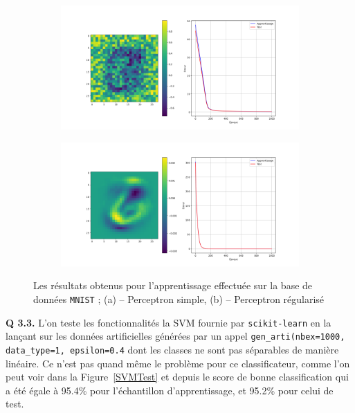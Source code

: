 \documentclass[a4paper,11pt]{article}
\theoremstyle{plain}
\theoremstyle{definition}
\begin{document}
\begin{figure}
    \centering
    \begin{subfigure}{1.0\textwidth}
    	\centering
    	\includegraphics{Figures/Figure_11.png}
    	\caption{}
    	\label{PercNotRegRes}
    \end{subfigure}

    \begin{subfigure}{1.0\textwidth}
    	\centering
    	\includegraphics{Figures/Figure_12.png}
    	\caption{}
    	\label{PercIsRegRes}
    \end{subfigure}
    \caption{Les résultats obtenus pour l'apprentissage effectuée sur la base de données \texttt{MNIST} ; (a) -- Perceptron simple, (b) -- Perceptron régularisé}
    \label{PercRegRes}
\end{figure}

\textbf{Q 3.3.} L'on teste les fonctionnalités la SVM fournie par \texttt{scikit-learn} en la lançant sur les données artificielles générées par un appel \texttt{gen\_arti(nbex=1000, data\_type=1, epsilon=0.4} dont les classes ne sont pas séparables de manière linéaire. Ce n'est pas quand même le problème pour ce classificateur, comme l'on peut voir dans la Figure~\ref{SVMTest} et depuis le score de bonne classification qui a été égale à 95.4\% pour l'échantillon d'apprentissage, et 95.2\% pour celui de test.
\end{document}
